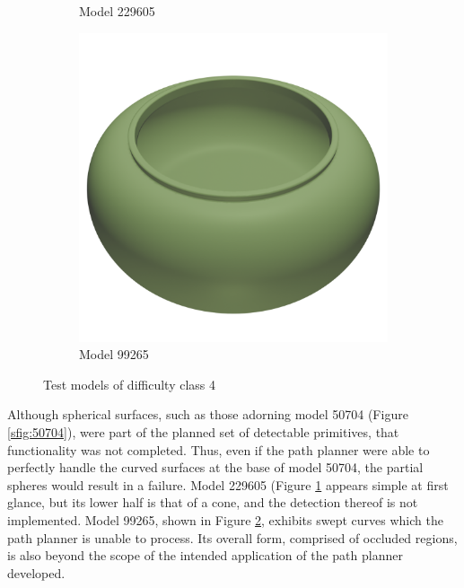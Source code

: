 \begin{figure}[htb]
\begin{subfigure}{0.3\textwidth}
	\caption{Model 229605}
	\label{sfig:229605}
\end{subfigure}
\hfill
\begin{subfigure}{0.3\textwidth}
	\includegraphics[width=\textwidth]{../resources/models/99265.png}
	\caption{Model 99265}
	\label{sfig:99265}
\end{subfigure}
\caption{Test models of difficulty class 4}
\label{fig:class_4_models}
\end{figure}

Although spherical surfaces, such as those adorning model 50704 (Figure \ref{sfig:50704}), were part of the planned set of detectable primitives, that functionality was not completed.
Thus, even if the path planner were able to perfectly handle the curved surfaces at the base of model 50704, the partial spheres would result in a failure.
Model 229605 (Figure \ref{sfig:229605} appears simple at first glance, but its lower half is that of a cone, and the detection thereof is not implemented.
Model 99265, shown in Figure \ref{sfig:99265}, exhibits swept curves which the path planner is unable to process.
Its overall form, comprised of occluded regions, is also beyond the scope of the intended application of the path planner developed.

